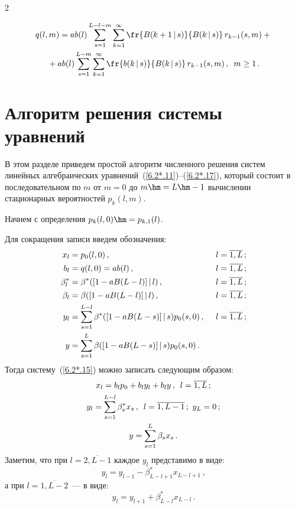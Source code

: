 \begin{multicols}{2}
\vspace*{-9pt}

\noindent
\begin{multline}
q(l,m) = a b(l)
\sum\limits_{s=1}^{L-l-m}
\sum\limits_{k=1}^\infty
\fr{B(k+1\,|\,s)}{ B(k\,|\,s)}\,
r_{k-1}(s,m)  +{}\\
{}+ a b(l) \sum\limits_{s=1}^{L-m}
\sum\limits_{k=1}^\infty
\fr{b(k\,|\,s)}{ B(k\,|\,s)}\,
r_{k-1}(s,m)\,,
\enskip m \ge 1\,.
\label{6.2*.17}
\end{multline}

\section{Алгоритм решения системы уравнений}

В этом разделе приведем простой алгоритм чис\-лен\-но\-го
решения сис\-тем линейных алгебраических урав\-не\-ний~(\ref{6.2*.11})--(\ref{6.2*.17}),
который со\-сто\-ит в последовательном по $m$ от $m=0$
до $m\hm=L\hm-1$ вычислении стационарных вероятностей
$p_{k}(l,m)$.

Начнем с определения $p_{k}(l,0)\hm=p_{k,1}(l)$.

Для сокращения записи введем обозначения:
\begin{alignat*}{2}
x_l &= p_{0}(l,0)\,, &\enskip l&=\overline{1,L}\,;
\\
b_l &= q(l,0) = a b(l)\,, &\enskip l&=\overline{1,L}\,;
\\
\beta^*_l &= \beta^*([1 - a B(L-l)]\,|\,l)\,, &\enskip l&=\overline{1,L}\,;
\\
\beta_l &= \beta([1 - a B(L-l)]\,|\,l)\,, &\enskip  l&=\overline{1,L}\,;
\\
y_l &= \sum\limits_{s=1}^{L-l} \beta^*([1 - a B(L-s)]\,|\,s) p_{0}(s,0)\,, &\enskip l&=\overline{1,L}\,;
\\
y &= \sum\limits_{s=1}^{L} \beta([1 - a B(L-s)]\,|\,s) p_{0}(s,0) \,.&&
\end{alignat*}
Тогда систему~(\ref{6.2*.15}) можно записать следующим
образом:
\begin{gather}
\label{6.3*.1}
x_{l}= b_l p_0 + b_l y_l + b_l y \,,\enskip l=\overline{1,L}\,;
\\
\label{6.3*.2}
y_l = \sum\limits_{s=1}^{L-l} \beta^*_s x_s \,,\enskip l=\overline{1,L-1}\,;
\ y_{L} = 0\,;
\\
\label{6.3*.3}
y= \sum\limits_{s=1}^{L} \beta_s x_s \,.
\end{gather}
Заметим, что при $l=\overline{2,L-1}$ каждое $y_l$
представимо в виде:
\begin{equation}
\label{6.3*.4}
y_l = y_{l-1} - \beta^*_{L-l+1} x_{L-l+1}\,,
\end{equation}
а при $l=\overline{1,L-2}$~--- в виде:
\begin{equation}
\label{6.3*.5}
y_l = y_{l+1} + \beta^*_{L-l} x_{L-l}\,.
\end{equation}


\end{multicols}

